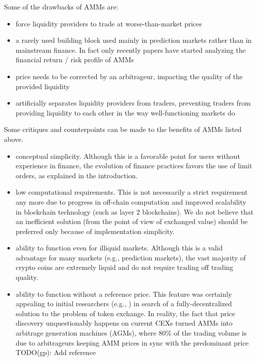 \documentclass[11pt, reqno]{amsart}
\theoremstyle{definition}
\theoremstyle{remark}
\begin{document}
Some of the drawbacks of AMMs are:
\begin{itemize}
	\item force liquidity providers to trade at worse-than-market prices
	\item a rarely used building block used mainly in prediction markets rather than
	      in mainstream finance. In fact only recently papers have started analyzing
	      the financial return / risk profile of AMMs \cite{MiMoRoZh22}
	\item price needs to be corrected by an arbitrageur, impacting the quality of
	      the provided liquidity
    \item artificially separates liquidity providers from traders, preventing traders
          from providing liquidity to each other in the way well-functioning
          markets do
\end{itemize}

Some critiques and counterpoints can be made to the benefits of AMMs listed above.
\begin{itemize}
	\item conceptual simplicity. Although this is a favorable point for users
	      without experience in finance, the evolution of finance practices favors the
	      use of limit orders, as explained in the introduction.
	\item low computational requirements. This is not necessarily a strict
	      requirement any more due to progress in off-chain computation and
          improved scalability in blockchain technology (such as layer 2
          blockchains). We do not believe that an inefficient solution (from
          the point of view of exchanged value) should be preferred only
          because of implementation simplicity.
	\item ability to function even for illiquid markets.
	      Although this is a valid advantage for many markets (e.g., prediction markets),
	      the vast majority of crypto coins are extremely liquid and do not require
	      trading off trading quality.
	\item ability to function without a reference price.
          This feature was certainly appealing to initial researchers (e.g., \cite{Bu17})
	      in search of a fully-decentralized solution to the problem
	      of token exchange. In reality, the fact that price discovery unquestionably
	      happens on current CEXs turned AMMs into arbitrage generation machines
	      (AGMs), where 80\% of the trading volume is due to arbitrageurs keeping AMM
	      prices in sync with the predominant price TODO(gp): Add reference
\end{itemize}
\end{document}
